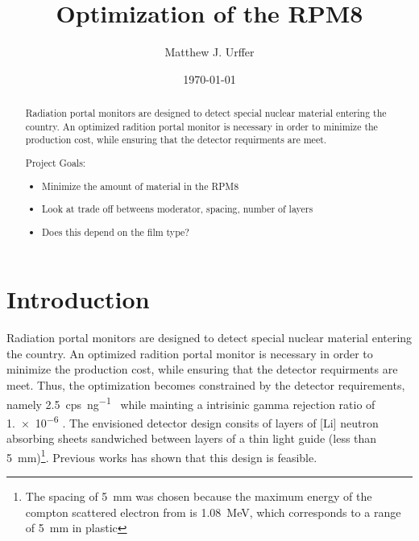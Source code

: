 \documentclass[draftcls,onecolumn]{IEEEtran}
\begin{document}
\title{Optimization of the RPM8}
\author{Matthew J. Urffer}
\date{\today}

\maketitle
\begin{abstract}
Radiation portal monitors are designed to detect special nuclear material entering the country.
An optimized radition portal monitor is necessary in order to minimize the production cost, while ensuring that the detector requirments are meet.

Project Goals:
\begin{itemize}
	\item Minimize the amount of material in the RPM8
	\item Look at trade off betweens moderator, spacing, number of layers
	\item Does this depend on the film type?
\end{itemize}
\end{abstract}

\IEEEpeerreviewmaketitle

\pagebreak
\tableofcontents
\listoftodos
\listoffigures
\listoftables
\lstlistoflistings
\pagebreak

\section{Introduction}
Radiation portal monitors are designed to detect special nuclear material entering the country.
An optimized radition portal monitor is necessary in order to minimize the production cost, while ensuring that the detector requirments are meet.
Thus, the optimization becomes constrained by the detector requirements, namely \SI{2.5}{cps\per\nano\gram{}} while mainting a intrisinic gamma rejection ratio of \num{1.e-6}  \cite{kouzes_neutron_2010,kouzes_neutron_1999}.
The envisioned detector design consits of layers of [Li] neutron absorbing sheets sandwiched between layers of a thin light guide (less than \SI{5}{\milli \meter})\footnote{The spacing of \SI{5}{\milli \meter} was chosen because the maximum energy of the compton scattered electron from  is \SI{1.08}{\mega \electronvolt}, which corresponds to a range of \SI{5}{\milli \meter} in plastic}.
Previous works has shown that this design is feasible.
 





\pagebreak
\appendix

\end{document}
